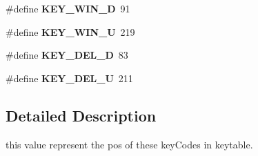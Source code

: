 \begin{DoxyCompactItemize}
\item 
\hypertarget{group__key__map_gac89347316a76c057d25f854fb71abbd4}{}\#define {\bfseries K\+E\+Y\+\_\+\+W\+I\+N\+\_\+\+D}~91\label{group__key__map_gac89347316a76c057d25f854fb71abbd4}

\item 
\hypertarget{group__key__map_ga5cb5cb8705bc7caabe4463a8e2932429}{}\#define {\bfseries K\+E\+Y\+\_\+\+W\+I\+N\+\_\+\+U}~219\label{group__key__map_ga5cb5cb8705bc7caabe4463a8e2932429}

\item 
\hypertarget{group__key__map_ga33f0ac1d69b19350ee108760aefef960}{}\#define {\bfseries K\+E\+Y\+\_\+\+D\+E\+L\+\_\+\+D}~83\label{group__key__map_ga33f0ac1d69b19350ee108760aefef960}

\item 
\hypertarget{group__key__map_gab7aeb2f62793a319fad16f8b5f754b2a}{}\#define {\bfseries K\+E\+Y\+\_\+\+D\+E\+L\+\_\+\+U}~211\label{group__key__map_gab7aeb2f62793a319fad16f8b5f754b2a}

\end{DoxyCompactItemize}


\subsection{Detailed Description}
this value represent the pos of these key\+Codes in keytable. 

